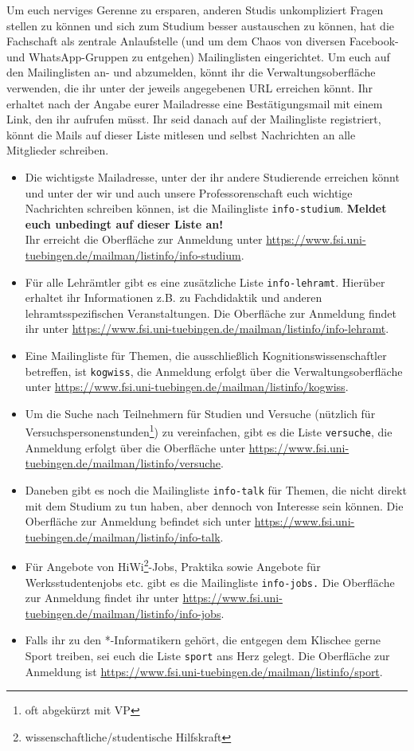 Um euch nerviges Gerenne zu ersparen, anderen Studis unkompliziert Fragen stellen zu können und
sich zum Studium besser austauschen zu können, hat die Fachschaft als zentrale Anlaufstelle (und um dem Chaos von diversen Facebook- und WhatsApp-Gruppen zu entgehen) Mailinglisten eingerichtet. 
Um euch auf den Mailinglisten an- und abzumelden, könnt ihr die Verwaltungsoberfläche verwenden, die ihr unter der jeweils angegebenen URL erreichen könnt. Ihr erhaltet nach der Angabe eurer Mailadresse eine Bestätigungsmail mit einem Link, den ihr aufrufen müsst. Ihr seid danach auf der Mailingliste registriert, könnt die Mails auf dieser Liste mitlesen und selbst Nachrichten an alle Mitglieder schreiben.
\begin{itemize}
\item Die wichtigste Mailadresse, unter der ihr andere Studierende erreichen könnt und unter der wir und auch unsere Professorenschaft euch wichtige Nachrichten schreiben können, ist die Mailingliste \texttt{info-studium}. \textbf{Meldet euch unbedingt auf dieser Liste an!}\\
Ihr erreicht die Oberfläche zur Anmeldung unter \url{https://www.fsi.uni-tuebingen.de/mailman/listinfo/info-studium}.
\iflehramt
\item Für alle Lehrämtler gibt es eine zusätzliche Liste \texttt{info-lehramt}. Hierüber erhaltet ihr Informationen z.B. zu Fachdidaktik und anderen lehramtsspezifischen Veranstaltungen. Die Oberfläche zur Anmeldung findet ihr unter \url{https://www.fsi.uni-tuebingen.de/mailman/listinfo/info-lehramt}.
\fi
\ifkogwiss 
\item Eine Mailingliste für Themen, die ausschließlich Kognitionswissenschaftler betreffen, ist
\texttt{kogwiss}, die Anmeldung erfolgt über die Verwaltungsoberfläche unter \url{https://www.fsi.uni-tuebingen.de/mailman/listinfo/kogwiss}.
\item Um die Suche nach Teilnehmern für Studien und Versuche (nützlich für Versuchspersonenstunden\footnote{oft abgekürzt mit VP}) zu vereinfachen, gibt es die Liste \texttt{versuche}, 
die Anmeldung erfolgt über die Oberfläche unter \url{https://www.fsi.uni-tuebingen.de/mailman/listinfo/versuche}. 
\fi
\item Daneben gibt es noch die Mailingliste \texttt{info-talk} für Themen, die nicht direkt mit dem Studium
zu tun haben, aber dennoch von Interesse sein können. Die Oberfläche zur Anmeldung befindet sich unter \url{https://www.fsi.uni-tuebingen.de/mailman/listinfo/info-talk}.
\item Für Angebote von HiWi\footnote{wissenschaftliche/studentische Hilfskraft}-Jobs, Praktika sowie Angebote für Werksstudentenjobs etc. gibt es die Mailingliste \texttt{info-jobs.} Die Oberfläche zur Anmeldung findet ihr unter \url{https://www.fsi.uni-tuebingen.de/mailman/listinfo/info-jobs}.
\item Falls ihr zu den *-Informatikern gehört, die entgegen dem Klischee gerne Sport treiben, sei euch die Liste \texttt{sport} ans Herz gelegt. Die Oberfläche zur Anmeldung ist \url{https://www.fsi.uni-tuebingen.de/mailman/listinfo/sport}. 
\end{itemize}
